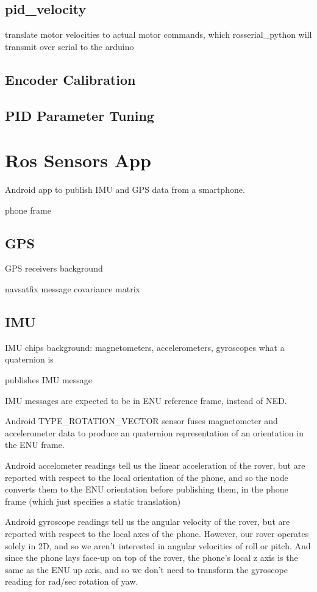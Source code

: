 \subsection{pid\_velocity}
translate motor velocities to actual motor commands, which rosserial\_python will transmit over serial to the arduino

\subsection{Encoder Calibration}

\subsection{PID Parameter Tuning}

\section{Ros Sensors App}
Android app to publish IMU and GPS data from a smartphone.

phone frame

\subsection{GPS}
GPS receivers background

navsatfix message
covariance matrix

\subsection{IMU}
IMU chips background: magnetometers, accelerometers, gyroscopes
what a quaternion is

publishes IMU message

IMU messages are expected to be in ENU reference frame, instead of NED.

Android TYPE\_ROTATION\_VECTOR sensor fuses magnetometer and accelerometer data to produce an quaternion representation of an orientation in the ENU frame.

Android accelometer readings tell us the linear acceleration of the rover, but are reported with respect to the local orientation of the phone, and so the node converts them to the ENU orientation before publishing them, in the phone frame (which just specifies a static translation)

Android gyroscope readings tell us the angular velocity of the rover, but are reported with respect to the local axes of the phone. However, our rover operates solely in 2D, and so we aren't interested in angular velocities of roll or pitch. And since the phone lays face-up on top of the rover, the phone's local z axis is the same as the ENU up axis, and so we don't need to transform the gyroscope reading for rad/sec rotation of yaw.



